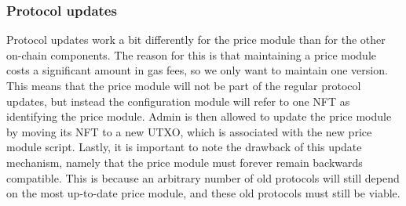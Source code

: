 \documentclass{article} %
\begin{document}
\subsubsection*{Protocol updates}

Protocol updates work a bit differently for the price module than for the other
on-chain components.
The reason for this is that maintaining a price module costs a significant
amount in gas fees, so we only want to maintain one version.
This means that the price module will not be part of the regular protocol
updates, but instead the configuration module will refer to one NFT as
identifying the price module.
Admin is then allowed to update the price module by moving its NFT to a new
UTXO, which is associated with the new price module script.
Lastly, it is important to note the drawback of this update mechanism, namely
that the price module must forever remain backwards compatible.
This is because an arbitrary number of old protocols will still depend on the
most up-to-date price module, and these old protocols must still be viable.

% 
% 
% 
% 
% 
% 
\end{document}
